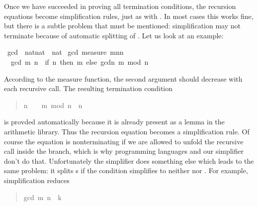 %
\begin{isabellebody}%
%
\begin{isamarkuptext}%
Once we have succeeded in proving all termination conditions, the recursion
equations become simplification rules, just as with
. In most cases this works fine, but there is a subtle
problem that must be mentioned: simplification may not
terminate because of automatic splitting of .
Let us look at an example:%
\end{isamarkuptext}%
\ gcd\ {\isacharcolon}{\isacharcolon}\ {\isachardoublequote}nat{\isacharasterisk}nat\ {\isasymRightarrow}\ nat{\isachardoublequote}\isanewline
{}\ gcd\ {\isachardoublequote}measure\ {\isacharparenleft}{\isasymlambda}{\isacharparenleft}m{\isacharcomma}n{\isacharparenright}{\isachardot}n{\isacharparenright}{\isachardoublequote}\isanewline
\ \ {\isachardoublequote}gcd\ {\isacharparenleft}m{\isacharcomma}\ n{\isacharparenright}\ {\isacharequal}\ {\isacharparenleft}if\ n{\isacharequal}\ then\ m\ else\ gcd{\isacharparenleft}n{\isacharcomma}\ m\ mod\ n{\isacharparenright}{\isacharparenright}{\isachardoublequote}%
\begin{isamarkuptext}%
\noindent
According to the measure function, the second argument should decrease with
each recursive call. The resulting termination condition
\begin{quote}

\begin{isabelle}%
\mbox{n}\ {\isasymnoteq}\ \ {\isasymLongrightarrow}\ \mbox{m}\ mod\ \mbox{n}\ {\isacharless}\ \mbox{n}
\end{isabelle}%

\end{quote}
is provded automatically because it is already present as a lemma in the
arithmetic library. Thus the recursion equation becomes a simplification
rule. Of course the equation is nonterminating if we are allowed to unfold
the recursive call inside the  branch, which is why programming
languages and our simplifier don't do that. Unfortunately the simplifier does
something else which leads to the same problem: it splits s if the
condition simplifies to neither  nor . For
example, simplification reduces
\begin{quote}

\begin{isabelle}%
gcd\ {\isacharparenleft}\mbox{m}{\isacharcomma}\ \mbox{n}{\isacharparenright}\ {\isacharequal}\ \mbox{k}
\end{isabelle}%


\end{quote}
\end{isamarkuptext}
\end{isabellebody}
